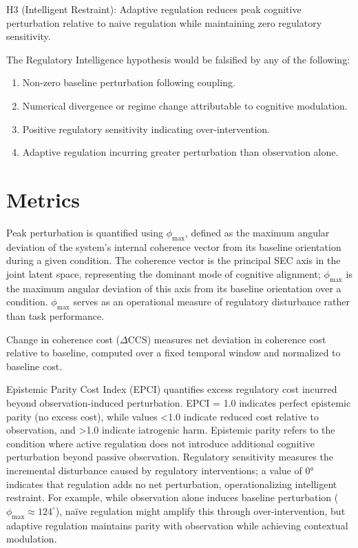 \documentclass[12pt,a4paper]{article}
\begin{document}
H3 (Intelligent Restraint): Adaptive regulation reduces peak cognitive perturbation relative to naive regulation while maintaining zero regulatory sensitivity.

The Regulatory Intelligence hypothesis would be falsified by any of the following: 
\begin{enumerate}
    \item Non-zero baseline perturbation following coupling.
    \item Numerical divergence or regime change attributable to cognitive modulation.
    \item Positive regulatory sensitivity indicating over-intervention.
    \item Adaptive regulation incurring greater perturbation than observation alone.
\end{enumerate}

\section{Metrics}

Peak perturbation is quantified using $\phi_{\max}$, defined as the maximum angular deviation of the system's internal coherence vector from its baseline orientation during a given condition. The coherence vector is the principal SEC axis in the joint latent space, representing the dominant mode of cognitive alignment; $\phi_{\max}$ is the maximum angular deviation of this axis from its baseline orientation over a condition. $\phi_{\max}$ serves as an operational measure of regulatory disturbance rather than task performance.

Change in coherence cost ($\Delta \mathrm{CCS}$) measures net deviation in coherence cost relative to baseline, computed over a fixed temporal window and normalized to baseline cost.

Epistemic Parity Cost Index (EPCI) quantifies excess regulatory cost incurred beyond observation-induced perturbation. EPCI = 1.0 indicates perfect epistemic parity (no excess cost), while values <1.0 indicate reduced cost relative to observation, and >1.0 indicate iatrogenic harm. Epistemic parity refers to the condition where active regulation does not introduce additional cognitive perturbation beyond passive observation. Regulatory sensitivity measures the incremental disturbance caused by regulatory interventions; a value of 0° indicates that regulation adds no net perturbation, operationalizing intelligent restraint. For example, while observation alone induces baseline perturbation ($\phi_{\max} \approx 124^\circ$), naïve regulation might amplify this through over-intervention, but adaptive regulation maintains parity with observation while achieving contextual modulation.
\end{document}
